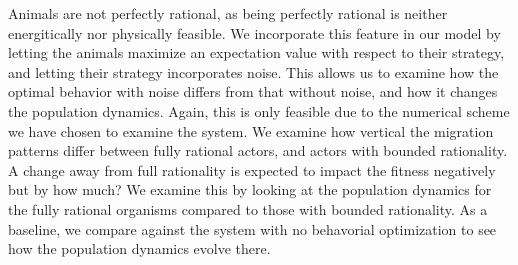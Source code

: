 Animals are not perfectly rational, as being perfectly rational is neither energitically nor physically feasible. We incorporate this feature in our model by letting the animals maximize an expectation value with respect to their strategy, and letting their strategy incorporates noise. This allows us to examine how the optimal behavior with noise differs from that without noise, and how it changes the population dynamics. Again, this is only feasible due to the numerical scheme we have chosen to examine the system. We examine how vertical the migration patterns differ between fully rational actors, and actors with bounded rationality. A change away from full rationality is expected to impact the fitness negatively but by how much? We examine this by looking at the population dynamics for the fully rational organisms compared to those with bounded rationality. As a baseline, we compare against the system with no behavorial optimization to see how the population dynamics evolve there.









